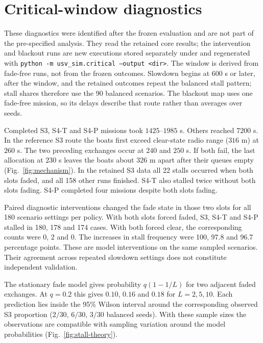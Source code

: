 \clearpage
\section{Critical-window diagnostics}\label{app:critical}
These diagnostics were identified after the frozen evaluation and are not part of the pre-specified analysis. They read the retained core results; the intervention and blackout runs are new executions stored separately under  and regenerated with \texttt{python -m usv\_sim.critical --output <dir>}. The window is derived from fade-free runs, not from the frozen outcomes. Slowdown begins at $600$ s or later, after the window, and the retained outcomes repeat the balanced stall pattern; stall shares therefore use the 90 balanced scenarios. The blackout map uses one fade-free mission, so its delays describe that route rather than averages over seeds.

Completed S3, S4-T and S4-P missions took $1425$--$1985$ s. Others reached $7200$ s. In the reference S3 route the boats first exceed clear-state radio range ($316$ m) at $260$ s. The two preceding exchanges occur at $240$ and $250$ s. If both fail, the last allocation at $230$ s leaves the boats about $326$ m apart after their queues empty (Fig.~\ref{fig:mechanism}). In the retained S3 data all 22 stalls occurred when both slots faded, and all 158 other runs finished. S4-T also stalled twice without both slots fading. S4-P completed four missions despite both slots fading.

Paired diagnostic interventions changed the fade state in those two slots for all 180 scenario settings per policy. With both slots forced faded, S3, S4-T and S4-P stalled in 180, 178 and 174 cases. With both forced clear, the corresponding counts were 0, 2 and 0. The increases in stall frequency were 100, 97.8 and 96.7 percentage points. These are model interventions on the same sampled scenarios. Their agreement across repeated slowdown settings does not constitute independent validation.

The stationary fade model gives probability $q(1-1/L)$ for two adjacent faded exchanges. At $q=0.2$ this gives $0.10$, $0.16$ and $0.18$ for $L=2,5,10$. Each prediction lies inside the 95\% Wilson interval around the corresponding observed S3 proportion ($2/30$, $6/30$, $3/30$ balanced seeds). With these sample sizes the observations are compatible with sampling variation around the model probabilities (Fig.~\ref{fig:stall-theory}).


